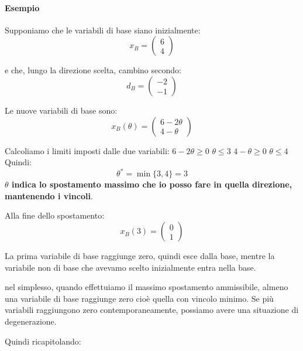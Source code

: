 \paragraph{Esempio}
Supponiamo che le variabili di base siano inizialmente:
\[
x_B=\begin{pmatrix}6\\4\end{pmatrix}
\]

e che, lungo la direzione scelta, cambino secondo:
\[
d_B=\begin{pmatrix}-2\\-1\end{pmatrix}
\]

Le nuove variabili di base sono:
\[
x_B(\theta)=
\begin{pmatrix}
6-2\theta\\
4-\theta
\end{pmatrix}
\]

Calcoliamo i limiti imposti dalle due variabili:
\(6-2\theta\geq0\) 	\(\theta\leq3\) 
\(4-\theta\geq0\) 	\(\theta\leq4\)
Quindi:
\[
\theta^*=\min\{3,4\}=3
\]
\textbf{$\theta$ indica lo spostamento massimo che io posso fare in quella direzione, mantenendo i vincoli}.

Alla fine dello spostamento:
\[
x_B(3)=
\begin{pmatrix}0\\1\end{pmatrix}
\]

La prima variabile di base raggiunge zero, quindi esce dalla base, mentre la variabile non di base che avevamo scelto inizialmente entra nella base.

nel simplesso, quando effettuiamo il massimo spostamento ammissibile, almeno una variabile di base raggiunge zero cioè quella con vincolo minimo. Se più variabili raggiungono zero contemporaneamente, possiamo avere una situazione di degenerazione.

Quindi ricapitolando:

